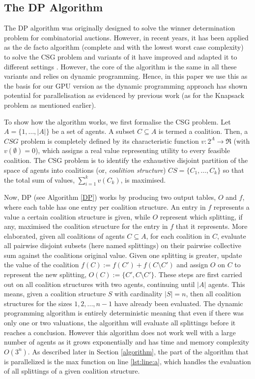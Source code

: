 \documentclass[a4paper, 12pt]{report}
\begin{document}
\subsection{The {DP} Algorithm} 
The DP algorithm \cite{DPalgorithm} was originally designed to solve the winner
determination problem for combinatorial auctions. However, in recent years, it
has been applied as the de facto  algorithm (complete and with the lowest worst
case complexity) to solve the CSG problem and variants of it have improved and
adapted it to different settings
\cite{DBLP:conf/atal/RahwanJ08,DBLP:conf/aamas/VoiceRJ12}. However, the core of
the algorithm is the same in all these variants and relies on dynamic
programming. Hence, in this paper we use this as the basis for our GPU version
as the dynamic programming approach has shown potential for parallelisation as
evidenced by previous work (as for the Knapsack problem as mentioned earlier). 

To show how the algorithm works, we first formalise the CSG problem.  Let
$A=\{1,\ldots,\vert A \vert \}$ be a set of agents. A subset $C \subseteq A$ is
termed a coalition.  Then, a $CSG$ problem is completely defined by its
characteristic function $v: 2^{A} \rightarrow \Re$ (with $v(\emptyset)=0$),
which assigns a real value representing utility to every feasible coalition. 
The CSG problem is to identify the exhaustive disjoint partition of the space of
agents into coalitions (or, \emph{coalition structure})  $CS=\{C_1,\ldots,C_k\}$
so that the total sum of values, $\sum^k_{i=1} v(C_k)$,
is maximised.

Now, DP (see Algorithm  \ref{DP}) works by producing two output tables, $O$ and
$f$, 
where each table has one entry per coalition structure. 
An entry in $f$ represents a value a certain coalition structure is given, 
while $O$ represent which splitting, if any, maximised the coalition structure
for the entry in $f$ that it represents.
More elaborated, given all coalitions of agents $C\subseteq A$, for each
coalition in $C$, evaluate all
pairwise disjoint subsets (here named splittings) on their pairwise collective
sum against the coalitions
original value. Given one splitting is greater, update the value of the
coalition $f(C) := f(C') + f(C\setminus C')$
and assign $O$ on $C$ to represent the new splitting, $O(C) := \{C',C\setminus
C'\}$. These steps are first carried out on all coalition structures with two
agents, continuing until $|A|$ agents.  This means, given a coalition structure
$S$ with cardinality $|S| = n$, then all coalition structures
for the sizes $1,2,...,n-1$ have already been evaluated. The dynamic programming
algorithm is entirely deterministic meaning that even if there was only one or
two valuations, the algorithm will evaluate all splittings before it reaches a
conclusion. However this algorithm does not work well with a large number of
agents as it grows exponentially and has time and memory complexity $O(3^n)$. As
described later in Section \ref{algorithm}, the part of the algorithm that is
parallelized is the max function on line \ref{lst:line:a}, which handles the
evaluation of all splittings of a given coalition structure.
\end{document}
